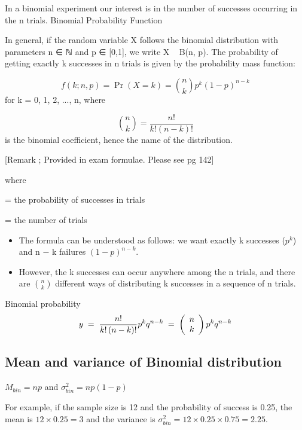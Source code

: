 \documentclass[12pt, a4paper]{report}
\theoremstyle{definition}
\theoremstyle{remark}
\begin{document}
	
	In a binomial experiment our interest is in the number of successes occurring in the n trials.
	Binomial Probability Function
	
	In general, if the random variable X follows the binomial distribution with parameters n ∈ ℕ and p ∈ [0,1], we write X ~ B(n, p). The probability of getting exactly k successes in n trials is given by the probability mass function:
	
\[	f(k;n,p)=\Pr(X=k)={\binom {n}{k}}p^{k}(1-p)^{n-k}\]
	for k = 0, 1, 2, ..., n, where
	
\[	{\binom {n}{k}}={\frac {n!}{k!(n-k)!}}\]
	is the binomial coefficient, hence the name of the distribution. 
	
	[Remark ; Provided in exam formulae. Please see pg 142]
	
	
	
	where
	
	= the probability of   successes in   trials
	
	= the number of trials
	
	\begin{itemize}
		\item The formula can be understood as follows: we want exactly k successes ($p^k$) and n − k failures $(1 − p)^{n − k}$.
		\item However, the k successes can occur anywhere among the n trials, and there are ${n \choose k}$ different ways of distributing k successes in a sequence of n trials.
	\end{itemize}
	
Binomial probability
	\[y \;=\; \frac{{n!}}{{k!\left( {n - k} \right)!}}p^k q^{n - k} \; = \; \left( {\begin{array}{*{20}c} n \\ k \\ \end{array}} \right)p^k q^{n -
		k}\]
	
\subsection{Mean and variance of Binomial distribution}
	
	$M_{bin} = np$  and $\sigma ^2 _{bin} = np(1-p)$
	
	For example, if the sample size is 12 and the probability of
	success is 0.25, the mean is $12 \times 0.25 = 3$ and the variance
	is $\sigma ^2 _{bin} = 12 \times 0.25 \times 0.75 = 2.25$.
	
\end{document}
